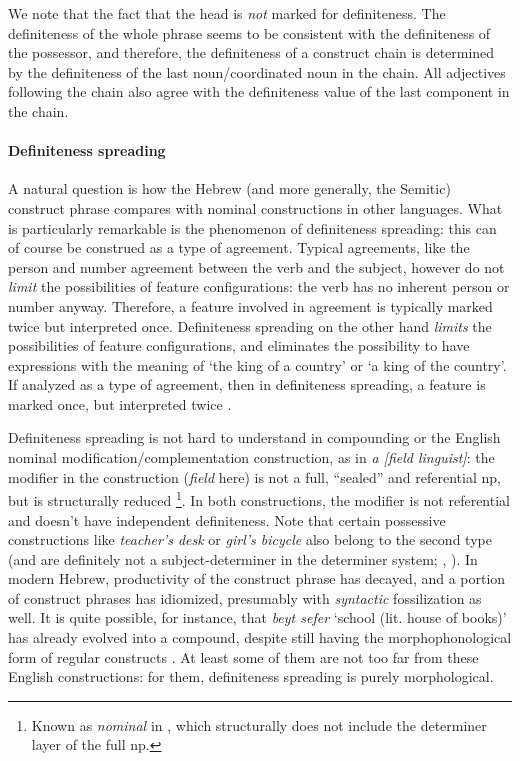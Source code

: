 \documentclass[a4paper, oneside, 12pt]{report}
\newcommand*{\citepage}[1]{p.~{#1}}
\newcommand{\form}[1]{\emph{#1}}
\newcommand{\translate}[1]{`#1'}
\begin{document}
We note that the fact that the head is \emph{not} marked for definiteness.
The definiteness of the whole phrase seems to be consistent with the definiteness of the possessor,
and therefore, the definiteness of a construct chain 
is determined by the definiteness of the last noun/coordinated noun in the chain.
All adjectives following the chain also agree with the definiteness value 
of the last component in the chain.

\paragraph*{Definiteness spreading}
A natural question is how the Hebrew (and more generally, the Semitic) construct phrase
compares with nominal constructions in other languages.
What is particularly remarkable is the phenomenon of definiteness spreading:
this can of course be construed as a type of agreement.
Typical agreements, like the person and number agreement between the verb and the subject,
however do not \emph{limit} the possibilities of feature configurations:
the verb has no inherent person or number anyway.
Therefore, a feature involved in agreement is typically marked twice but interpreted once.
Definiteness spreading on the other hand \emph{limits} the possibilities of feature configurations,
and eliminates the possibility to have expressions with the meaning of 
\translate{the king of a country} or \translate{a king of the country}.
If analyzed as a type of agreement,
then in definiteness spreading, a feature is marked once,
but interpreted twice \citep{dobrovie2000definiteness}.

Definiteness spreading is not hard to understand in compounding
or the English nominal modification/complementation construction, as in \form{a [field linguist]}:
the modifier in the construction (\form{field} here) is not a full, ``sealed'' and referential \ac{np},
but is structurally reduced%
\footnote{
    Known as \form{nominal} in \citet{cgel},
    which structurally does not include the determiner layer of the full \ac{np}.
}.
In both constructions, the modifier is not referential
and doesn't have independent definiteness.
Note that certain possessive constructions like \form{teacher's desk} or \form{girl's bicycle} also belong to the second type
(and are definitely not a subject-determiner in the determiner system;
\citealt[\citepage{469}]{cgel}, \citealt{alexiadou2005possessors}).
In modern Hebrew, productivity of the construct phrase has decayed,
and a portion of construct phrases has idiomized,
presumably with \emph{syntactic} fossilization as well.
It is quite possible, for instance, that \form{beyt sefer} \translate{school (lit. house of books)}
has already evolved into a compound,
despite still having the morphophonological form of regular constructs
\citep{siloni2003prosodic}.
At least some of them are not too far from these English constructions:
for them, definiteness spreading is purely morphological.
\end{document}
